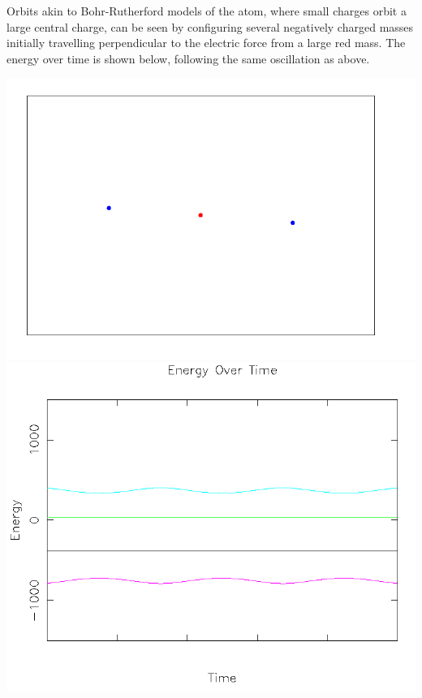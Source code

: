 \documentclass{article}
\begin{document}
Orbits akin to Bohr-Rutherford models of the atom,
where small charges orbit a large central charge,
can be seen by configuring several negatively charged masses initially travelling
perpendicular to the electric force from a large red mass.
The energy over time is shown below, following the same oscillation as above.
\\
\begin{center}
    \includegraphics[scale=0.5]{atom}
    \includegraphics[scale=0.5]{atom_energy}
\end{center}
\end{document}

